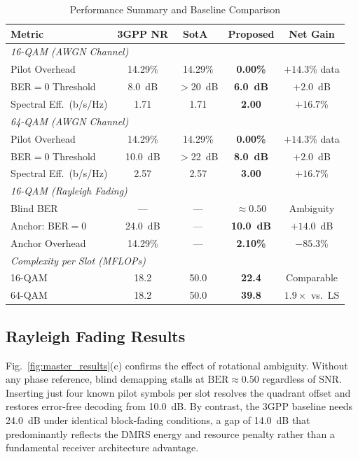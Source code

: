 \documentclass{ieeeaccess}
\begin{document}
\begin{table}[!t]
\caption{Performance Summary and Baseline Comparison}
\label{tab:perf_summary}
\centering
\footnotesize
\setlength{\tabcolsep}{3.5pt}
\begin{tabular}{lcccc}
\toprule
\textbf{Metric} & \textbf{3GPP NR} & \textbf{SotA~\cite{ye2018}} & \textbf{Proposed} & \textbf{Net Gain} \\
\midrule
\multicolumn{5}{l}{\textit{16-QAM (AWGN Channel)}} \\
Pilot Overhead        & 14.29\% & 14.29\% & \textbf{0.00\%}  & $+14.3\%$ data \\
BER$=0$ Threshold     & 8.0~dB  & $>$20~dB & \textbf{6.0~dB} & $+2.0$~dB \\
Spectral Eff.\ (b/s/Hz) & 1.71 & 1.71 & \textbf{2.00}      & $+16.7\%$ \\
\midrule
\multicolumn{5}{l}{\textit{64-QAM (AWGN Channel)}} \\
Pilot Overhead        & 14.29\% & 14.29\% & \textbf{0.00\%}  & $+14.3\%$ data \\
BER$=0$ Threshold     & 10.0~dB & $>$22~dB & \textbf{8.0~dB} & $+2.0$~dB \\
Spectral Eff.\ (b/s/Hz) & 2.57 & 2.57 & \textbf{3.00}      & $+16.7\%$ \\
\midrule
\multicolumn{5}{l}{\textit{16-QAM (Rayleigh Fading)}} \\
Blind BER             & ---     & ---     & $\approx0.50$    & Ambiguity \\
Anchor: BER$=0$       & 24.0~dB & ---     & \textbf{10.0~dB} & $+14.0$~dB \\
Anchor Overhead       & 14.29\% & ---     & \textbf{2.10\%}  & $-85.3\%$ \\
\midrule
\multicolumn{5}{l}{\textit{Complexity per Slot (MFLOPs)}} \\
16-QAM                & 18.2    & 50.0    & \textbf{22.4}    & Comparable \\
64-QAM                & 18.2    & 50.0    & \textbf{39.8}    & $1.9\times$ vs.\ LS \\
\bottomrule
\end{tabular}
\end{table}

\subsection{Rayleigh Fading Results}

Fig.~\ref{fig:master_results}(c) confirms the effect of rotational ambiguity.
Without any phase reference, blind demapping stalls at $\mathrm{BER}\approx0.50$
regardless of SNR. Inserting just four known pilot symbols per slot resolves the
quadrant offset and restores error-free decoding from 10.0~dB. By contrast, the
3GPP baseline needs 24.0~dB under identical block-fading conditions, a gap of
14.0~dB that predominantly reflects the DMRS energy and resource penalty rather
than a fundamental receiver architecture advantage.
\end{document}
